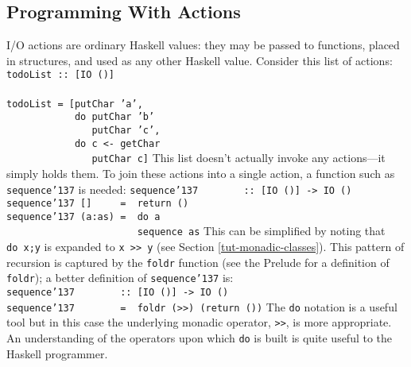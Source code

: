 \subsection{Programming With Actions}
I/O actions are ordinary Haskell
values: they may be passed to functions, placed in structures, and
used as any other Haskell value.  Consider this list of actions:
\bprog
\mbox{\tt todoList\ ::\ [IO\ ()]}\\
\mbox{\tt }\\[-8pt]
\mbox{\tt todoList\ =\ [putChar\ 'a',}\\
\mbox{\tt \ \ \ \ \ \ \ \ \ \ \ \ do\ putChar\ 'b'}\\
\mbox{\tt \ \ \ \ \ \ \ \ \ \ \ \ \ \ \ putChar\ 'c',}\\
\mbox{\tt \ \ \ \ \ \ \ \ \ \ \ \ do\ c\ <-\ getChar}\\
\mbox{\tt \ \ \ \ \ \ \ \ \ \ \ \ \ \ \ putChar\ c]}
\eprog
This list doesn't actually invoke any actions---it simply holds them.
To join these actions into a single action, a function such as
\mbox{\tt sequence{\char'137}} is needed:
\bprog
\mbox{\tt sequence{\char'137}\ \ \ \ \ \ \ \ ::\ [IO\ ()]\ ->\ IO\ ()}\\
\mbox{\tt sequence{\char'137}\ []\ \ \ \ \ =\ \ return\ ()}\\
\mbox{\tt sequence{\char'137}\ (a:as)\ =\ \ do\ a}\\
\mbox{\tt \ \ \ \ \ \ \ \ \ \ \ \ \ \ \ \ \ \ \ \ \ \ \ sequence\ as}
\eprog
This can be simplified by noting that \mbox{\tt do\ x;y} is expanded to
\mbox{\tt x\ >>\ y} (see Section \ref{tut-monadic-classes}).  This pattern of
recursion is captured by the \mbox{\tt foldr} function (see the Prelude for a
definition of \mbox{\tt foldr}); a better definition of \mbox{\tt sequence{\char'137}} is:
\bprog
\mbox{\tt sequence{\char'137}\ \ \ \ \ \ \ \ ::\ [IO\ ()]\ ->\ IO\ ()}\\
\mbox{\tt sequence{\char'137}\ \ \ \ \ \ \ \ =\ \ foldr\ (>>)\ (return\ ())}
\eprog
The \mbox{\tt do} notation is a useful tool but in this case the underlying
monadic operator, \mbox{\tt >>}, is more appropriate.  An understanding of the
operators upon which \mbox{\tt do} is built is quite useful to the Haskell
programmer. 

